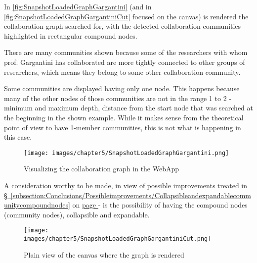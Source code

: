 In \hyperref[fig:SnapshotLoadedGraphGargantini]{\autoref{fig:SnapshotLoadedGraphGargantini}} (and in \hyperref[fig:SnapshotLoadedGraphGargantiniCut]{\autoref{fig:SnapshotLoadedGraphGargantiniCut}} focused on the canvas) is rendered the collaboration graph searched for, with the detected collaboration communities highlighted in rectangular compound nodes.

There are many communities shown because some of the researchers with whom prof. Gargantini has collaborated are more tightly connected to other groups of researchers, which means they belong to some other collaboration community.

Some communities are displayed having only one node. This happens because many of the other nodes of those communities are not in the range 1 to 2 - minimum and maximum depth, distance from the start node that was searched at the beginning in the shown example. While it makes sense from the theoretical point of view to have 1-member communities, this is not what is happening in this case.

\begin{figure}[H]%
	\centering%
	\texttt{[image: images/chapter5/SnapshotLoadedGraphGargantini.png]}%
	\caption[Visualizing the collaboration graph in the WebApp]{Visualizing the collaboration graph in the \gls{WebApp}}%
	\label{fig:SnapshotLoadedGraphGargantini}%
\end{figure}%

A consideration worthy to be made, in view of possible improvements treated in \hyperref[subsection:Conclusions/Possibleimprovements/Collapsibleandexpandablecommunitycompoundnodes]{\S\ \ref{subsection:Conclusions/Possibleimprovements/Collapsibleandexpandablecommunitycompoundnodes}} on \hyperref[subsection:Conclusions/Possibleimprovements/Collapsibleandexpandablecommunitycompoundnodes]{page \pageref{subsection:Conclusions/Possibleimprovements/Collapsibleandexpandablecommunitycompoundnodes}} - is the possibility of having the compound nodes (community nodes), collapsible and expandable.\label{tobementionedinconclusions/Collapsibleandexpandablecommunitycompoundnodes}

\begin{figure}[H]%
	\centering%
	\texttt{[image: images/chapter5/SnapshotLoadedGraphGargantiniCut.png]}%
	\caption[Plain view of the canvas where the graph is rendered]{Plain view of the canvas where the graph is rendered}%
	\label{fig:SnapshotLoadedGraphGargantiniCut}%
\end{figure}%

